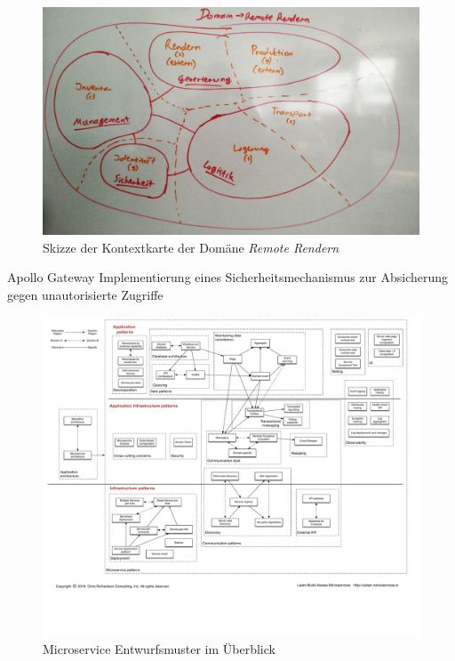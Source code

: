 \begin{figure}[!ht]
  \vspace{.02\textheight}
  \centering
  \includegraphics[width=\textwidth]{res/img/contextmap_rrRemote.jpg}
  \caption{Skizze der Kontextkarte der Domäne \emph{Remote Rendern}}
  \label{fig:drawing_contextmap_rrRemote}
\end{figure}
\clearpage

\begin{listing}[!ht]
  \vspace{.02\textheight}
  \caption{Apollo Gateway Implementierung eines Sicherheitsmechanismus zur Absicherung gegen unautorisierte Zugriffe}
  \label{code:agw-security-function}
\end{listing}

\begin{figure}
  \centering
    \includegraphics[width=\textwidth]{res/img/MicroservicePatternLanguage.pdf}
  \caption{Microservice Entwurfsmuster im Überblick \parencite{richardson2019mspatternlanguage}}
  \label{fig:microservice_patterns}
\end{figure}